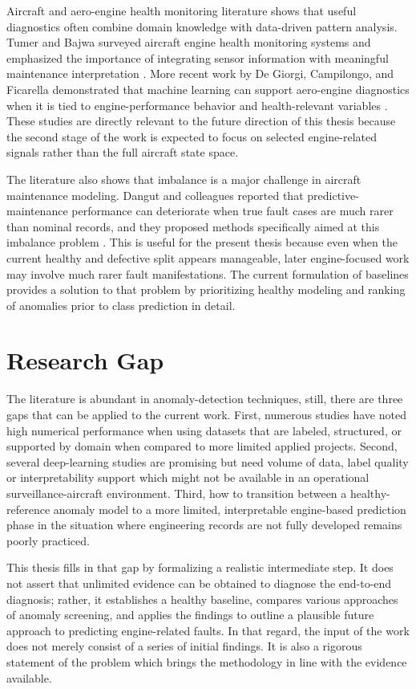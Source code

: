 \documentclass[12pt,a4paper]{report}
\begin{document}
	Aircraft and aero-engine health monitoring literature shows that useful diagnostics often combine domain knowledge with data-driven pattern analysis. Tumer and Bajwa surveyed aircraft engine health monitoring systems and emphasized the importance of integrating sensor information with meaningful maintenance interpretation \cite{tumer1999survey}. More recent work by De Giorgi, Campilongo, and Ficarella demonstrated that machine learning can support aero-engine diagnostics when it is tied to engine-performance behavior and health-relevant variables \cite{degiorgi2018engine}. These studies are directly relevant to the future direction of this thesis because the second stage of the work is expected to focus on selected engine-related signals rather than the full aircraft state space.
	
	The literature also shows that imbalance is a major challenge in aircraft maintenance modeling. Dangut and colleagues reported that predictive-maintenance performance can deteriorate when true fault cases are much rarer than nominal records, and they proposed methods specifically aimed at this imbalance problem \cite{dangut2022imbalanced}. This is useful for the present thesis because even when the current healthy and defective split appears manageable, later engine-focused work may involve much rarer fault manifestations. The current formulation of baselines provides a solution to that problem by prioritizing healthy modeling and ranking of anomalies prior to class prediction in detail.
	
	\section{Research Gap}
	
	The literature is abundant in anomaly-detection techniques, still, there are three gaps that can be applied to the current work. First, numerous studies have noted high numerical performance when using datasets that are labeled, structured, or supported by domain when compared to more limited applied projects. Second, several deep-learning studies are promising but need volume of data, label quality or interpretability support which might not be available in an operational surveillance-aircraft environment. Third, how to transition between a healthy-reference anomaly model to a more limited, interpretable engine-based prediction phase in the situation where engineering records are not fully developed remains poorly practiced.
	
	This thesis fills in that gap by formalizing a realistic intermediate step. It does not assert that unlimited evidence can be obtained to diagnose the end-to-end diagnosis; rather, it establishes a healthy baseline, compares various approaches of anomaly screening, and applies the findings to outline a plausible future approach to predicting engine-related faults. In that regard, the input of the work does not merely consist of a series of initial findings. It is also a rigorous statement of the problem which brings the methodology in line with the evidence available.
	
\end{document}

